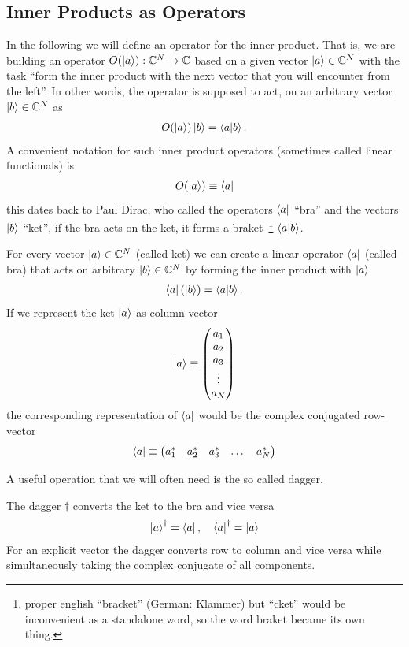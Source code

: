 \subsection{Inner Products as Operators}
In the following we will define an operator for the inner product. That is, we are building an operator $O(\ket{a}): \mathbb{C}^N \rightarrow \mathbb{C}$ based on a given vector $\ket{a}\in\mathbb{C}^N$ with the task ``form the inner product with the next vector that you will encounter from the left''. 
In other words, the operator is supposed to act, on an arbitrary vector $\ket{b}\in \mathbb{C}^N$ as
\begin{align}
    O(\ket{a}) \ket{b} = \braket{a}{b}.
\end{align}
A convenient notation for such inner product operators (sometimes called linear functionals) is
\begin{align}
    O(\ket{a}) \equiv \bra{a}
\end{align}
this dates back to Paul Dirac, who called the operators $\bra{a}$ ``bra'' and the vectors $\ket{b}$ ``ket'', if the bra acts on the ket, it forms a braket~\footnote{proper english ``bracket'' (German: Klammer) but ``cket'' would be inconvenient as a standalone word, so the word braket became its own thing.} $\braket{a}{b}$.
\begin{def*}[bra] For every vector $\ket{a}\in\mathbb{C}^N$ (called ket) we can create a linear operator $\bra{a}$ (called bra) that acts on arbitrary $\ket{b}\in\mathbb{C}^N$ by forming the inner product with $\ket{a}$
\begin{align*}
    \bra{a}\left(\ket{b}\right) = \braket{a}{b}.
\end{align*}
If we represent the ket $\ket{a}$ as column vector
\begin{align*}
    \ket{a} \equiv \begin{pmatrix}
        a_1\\a_2\\a_3\\\vdots\\a_N
    \end{pmatrix}
\end{align*}
the corresponding representation of $\bra{a}$ would be the complex conjugated row-vector
\begin{align*}
    \bra{a} \equiv \begin{pmatrix}
        a_1^*&a_2^*&a_3^*&\dots&a_N^*
    \end{pmatrix}
\end{align*}   
\end{def*}
A useful operation that we will often need is the so called dagger.
\begin{def*}[dagger] The dagger $\dagger$ converts the ket to the bra and vice versa
\begin{align*}
    \ket{a}^\dagger = \bra{a},\quad \bra{a}^\dagger = \ket{a}
\end{align*}
For an explicit vector the dagger converts row to column and vice versa while simultaneously taking the complex conjugate of all components.
\end{def*}

